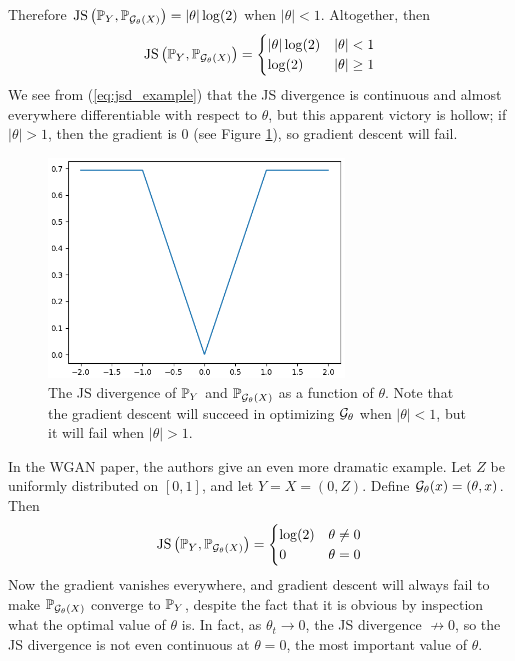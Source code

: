 \documentclass{article}
\begin{document}
	Therefore \(\mathrm{JS}\left(\mathbb{P}_Y, \mathbb{P}_{\mathcal{G}_\theta(X)}\right) = |\theta|\log(2)\) when \(|\theta| < 1\). Altogether, then
	\begin{equation}\label{eq:jsd_example}
		\mathrm{JS}\left(\mathbb{P}_Y, \mathbb{P}_{\mathcal{G}_\theta(X)}\right) =
		\begin{cases}
			|\theta| \log(2) & |\theta| < 1 \\
			\log(2) & |\theta| \ge 1
		\end{cases}
	\end{equation}
	We see from (\ref{eq:jsd_example}) that the JS divergence is continuous and almost everywhere differentiable with respect to \(\theta\), but this apparent victory is hollow; if \(|\theta| > 1\), then the gradient is 0 (see Figure \ref{fig:jsd_example}), so gradient descent will fail.
	\begin{figure}
		\begin{center}
			\includegraphics[width=0.7\textwidth]{jsd_example.png}
			\caption{The JS divergence of \(\mathbb{P}_Y\) and \(\mathbb{P}_{\mathcal{G}_\theta(X)}\) as a function of \(\theta\). Note that the gradient descent will succeed in optimizing \(\mathcal{G}_\theta\) when \(|\theta| < 1\), but it will fail when \(|\theta| > 1\).}
			\label{fig:jsd_example}
		\end{center}
	\end{figure}
	
	In the WGAN paper, the authors give an even more dramatic example. Let \(Z\) be uniformly distributed on \([0,1]\), and let \(Y = X = (0, Z)\). Define \(\mathcal{G}_\theta(x) = (\theta, x)\). Then
	\begin{equation}\label{eq:jsd_example2}
		\mathrm{JS}\left(\mathbb{P}_Y, \mathbb{P}_{\mathcal{G}_\theta(X)}\right) = \begin{cases}
			\log(2) & \theta \ne 0 \\
			0 & \theta = 0
		\end{cases}
	\end{equation}
	Now the gradient vanishes everywhere, and gradient descent will always fail to make \(\mathbb{P}_{\mathcal{G}_{\theta}(X)}\) converge to \(\mathbb{P}_Y\), despite the fact that it is obvious by inspection what the optimal value of \(\theta\) is. In fact, as \(\theta_t \to 0\), the JS divergence \(\not\to 0\), so the JS divergence is not even continuous at \(\theta = 0\), the most important value of \(\theta\).
	
\end{document}
